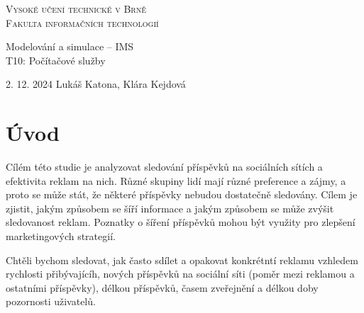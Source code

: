 \documentclass[11pt, a4paper]{article}
\begin{document}
\begin{titlepage}
    \begin{center}
        \textsc{\Huge Vysoké učení technické v Brně\\\vspace{0.5em}\huge Fakulta informačních technologií}
        
        {\LARGE Modelování a simulace -- IMS\\\vspace{0.5em}}
        {\Huge T10: Počítačové služby}
        
    \end{center}
    {\Large 2. 12. 2024 \hfill Lukáš Katona, Klára Kejdová}
\end{titlepage}

\newpage

\section{Úvod}

Cílém této studie je analyzovat sledování příspěvků na sociálních sítích a efektivita reklam na nich.
Různé skupiny lidí mají různé preference a zájmy, a proto se může stát,
že některé příspěvky nebudou dostatečně sledovány. Cílem je zjistit,
jakým způsobem se šíří informace a jakým způsobem se může zvýšit sledovanost reklam. 
Poznatky o šíření příspěvků mohou být využity pro zlepšení marketingových strategií.


Chtěli bychom sledovat, jak často sdílet a opakovat konkrétntí reklamu vzhledem rychlosti přibývajícíh, nových příspěvků na sociální síti
(poměr mezi reklamou a ostatními příspěvky), délkou příspěvků, časem zveřejnění a délkou doby pozornosti uživatelů.
\end{document}
